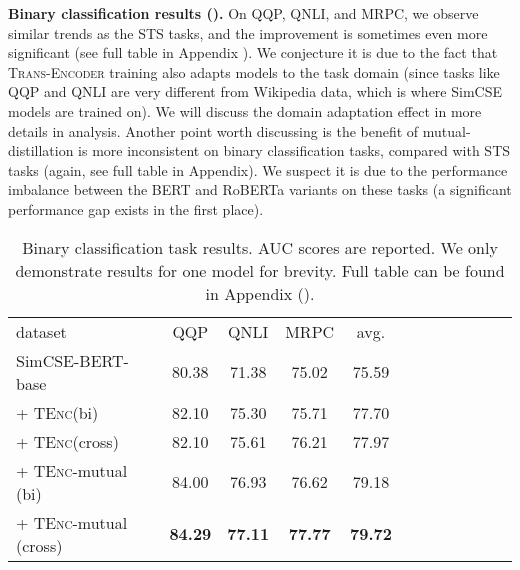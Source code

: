 \documentclass{article} \usepackage{iclr2021_conference,times}
\newcommand{\modelname}{\textsc{Trans-Encoder}\xspace}
\newcommand{\tenc}{\textsc{TEnc}\xspace}
\begin{document}
\textbf{Binary classification results ().} On QQP, QNLI, and MRPC, we observe similar trends as the STS tasks, and the improvement is sometimes even more significant (see full table in Appendix ). We conjecture it is due to the fact that \modelname training also adapts models to the task domain (since tasks like QQP and QNLI are very different from Wikipedia data, which is where SimCSE models are trained on). We will discuss the domain adaptation effect in more details in analysis. Another point worth discussing is the benefit of mutual-distillation is more inconsistent on binary classification tasks, compared with STS tasks (again, see full table  in Appendix). We suspect it is due to the performance imbalance between the BERT and RoBERTa variants on these tasks (a significant performance gap exists in the first place). 



\begin{table}[!t] \centering
\begin{tabular}{lccccccccccc}
\cmidrule[1.5pt]{1-10}
dataset  & QQP & QNLI & MRPC & avg.\\
\cmidrule[1.5pt]{1-10}
  SimCSE-BERT-base & 80.38 & 71.38 & 75.02 & 75.59 \\
  + \tenc (bi) & 82.10 & 75.30 & 75.71 & 77.70 \\
  + \tenc (cross) & 82.10 & 75.61  & 76.21 & 77.97 \\
 \rowcolor{blue!5}
  + \tenc-mutual (bi) &  84.00 & 76.93 & 76.62 & 79.18  \\
   \rowcolor{blue!5}
  + \tenc-mutual (cross) & \textbf{84.29} & \textbf{77.11} & \textbf{77.77} & \textbf{79.72} \\
\cmidrule[1.5pt]{1-10}
\end{tabular}
\vspace{-1mm}
\caption{Binary classification task results. AUC scores are reported. We only demonstrate results for one model for brevity. Full table can be found in Appendix ().}
\label{tab:binary}
\end{table}
\end{document}
